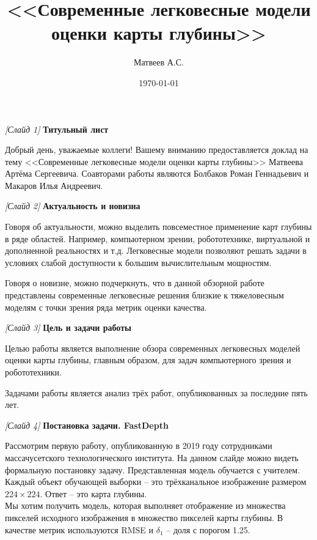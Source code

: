\documentclass[a4paper, 14pt]{extarticle}
\title{<<Современные легковесные модели оценки карты глубины>>}
\author{Матвеев А.С.}
\date{\today}
\begin{document}
	\maketitle
	\thispagestyle{empty} %
	\pagebreak
	
	
	\setlength{\parindent}{1.25cm} %
	\textit{[Слайд 1]} \textbf{Титульный лист}
	
	Добрый день, уважаемые коллеги! Вашему вниманию предоставляется доклад на тему <<Современные легковесные модели оценки карты глубины>> Матвеева Артёма Сергеевича. Соавторами работы являются Болбаков Роман Геннадьевич и Макаров Илья Андреевич.
	\bigskip
	
	
	\textit{[Слайд 2]} \textbf{Актуальность и новизна}
	
	Говоря об актуальности, можно выделить повсеместное применение карт глубины в ряде областей. Например, компьютерном зрении, робототехнике, виртуальной и дополненной реальностях и т.д. Легковесные модели позволяют решать задачи в условиях слабой доступности к большим вычислительным мощностям. 
	
	Говоря о новизне, можно подчеркнуть, что в данной обзорной работе представлены современные легковесные решения близкие к тяжеловесным моделям с точки зрения ряда метрик оценки качества.
	\bigskip
	
	
	\textit{[Слайд 3]} \textbf{Цель и задачи работы}
	
	Целью работы является выполнение обзора современных легковесных моделей оценки карты глубины, главным образом, для задач компьютерного зрения и робототехники. 
	
	Задачами работы является анализ трёх работ, опубликованных за последние пять лет. 
	\bigskip
	
	
	\textit{[Слайд 4]} \textbf{Постановка задачи. FastDepth}
	
	Рассмотрим первую работу, опубликованную в 2019 году сотрудниками массачусетского технологического института. На данном слайде можно видеть формальную постановку задачу. Представленная модель обучается с учителем. Каждый объект обучающей выборки -- это трёхканальное изображение размером $224 \times 224$. Ответ -- это карта глубины. \\ Мы хотим получить модель, которая выполняет отображение из множества пикселей исходного изображения в множество пикселей карты глубины. В качестве метрик используются RMSE и $\delta_1$ -- доля с порогом 1.25. 
	\bigskip
	
\end{document}
